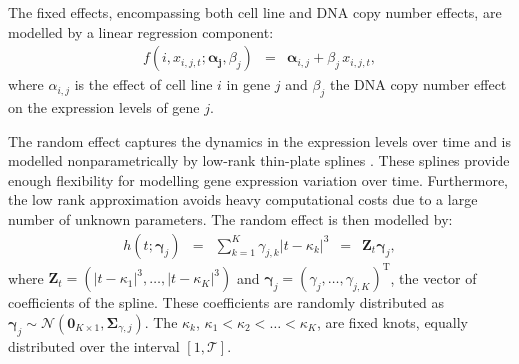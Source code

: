 The fixed effects, encompassing both cell line and DNA copy number effects, are modelled by a linear regression component:
\begin{eqnarray*}
f( i, x_{i,j,t}; \boldsymbol{\alpha_j}, \beta_j) & = & \boldsymbol{\alpha}_{i,j} + \beta_j \, x_{i,j,t},
\end{eqnarray*}
where $\alpha_{i,j}$ is the effect of cell line $i$ in gene $j$ and $\beta_j$ the DNA copy number effect on the expression levels of gene $j$.

The random effect captures the dynamics in the expression levels over time and is modelled nonparametrically by low-rank thin-plate splines \cite{Crainiceanu2005}. These splines provide enough flexibility for modelling gene expression variation over time. Furthermore, the low rank approximation avoids heavy computational costs due to a large number of unknown parameters. The random effect is then modelled by:
\begin{eqnarray*}
h(t; \boldsymbol{\gamma}_j) & = & \sum_{k=1}^K \gamma_{j,k} \left| t-\kappa_k \right|^3 \, \, \, = \, \, \, \mathbf{Z}_t \boldsymbol{\gamma}_j,
\end{eqnarray*}
where $\mathbf{Z}_t =  (| t-\kappa_1 |^3, \ldots, | t-\kappa_K |^3)$ and $\boldsymbol{\gamma}_{j} = (\gamma_{j}, \ldots, \gamma_{j,K})^{\mathrm{T}}$, the vector of coefficients of the spline. These coefficients are randomly distributed as $\boldsymbol{\gamma}_{j} \sim \mathcal{N}(\mathbf{0}_{K \times 1}, \boldsymbol{\Sigma}_{\gamma, j})$. The $\kappa_k$, $\kappa_1 < \kappa_2 < \dots < \kappa_K$, are fixed knots, equally distributed over the interval $[1, \mathcal{T}]$.

